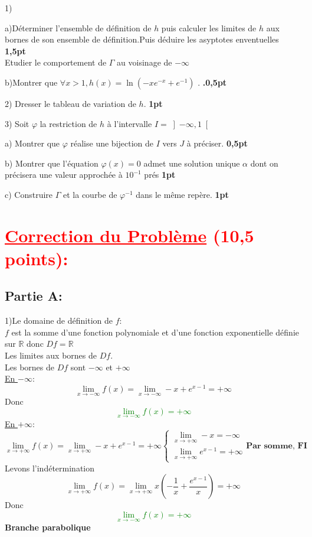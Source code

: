 \documentclass[12pt]{article}
\begin{document}
1)

	a)Déterminer l’ensemble de définition de $h$ puis calculer les limites de $h$ aux bornes de son ensemble de définition.Puis déduire les asyptotes enventuelles \textbf{1,5pt}\\
Etudier le comportement de  $\Gamma$ au voisinage de $-\infty$

	b)Montrer que $\forall x>1, h(x)=\ln(-xe^{-x}+e^{-1}) $ . \textbf{.0,5pt}
	
2) Dresser le tableau de variation de  $h$.   \textbf{1pt}
    
3) Soit $\varphi$ la restriction de $h$ à l’intervalle $I=\left]-\infty, 1\right[ $
    
    a) Montrer que $\varphi$  réalise une bijection de $I$ vers $J$  à préciser.
    \textbf{0,5pt}
        
    b) Montrer que l’équation $\varphi(x)=0$ admet une solution unique $\alpha$ dont on précisera une valeur approchée à $10^{-1}$ prés   \textbf{1pt}
    
    c) Construire $\Gamma$ et la courbe de $\varphi^{-1}$  dans le même repère.  \textbf{1pt}
\section*{\textcolor{red}{\underline{Correction du Problème} (10,5 points):}}
\subsection*{Partie A:}
1)Le domaine de définition de $f$:\\
$f$ est la somme d'une fonction polynomiale et d'une fonction exponentielle définie sur $\mathbb{R}$ donc $Df=\mathbb{R}$\\
Les limites aux bornes de $Df$.\\
Les bornes de $Df$ sont $-\infty$ et $+\infty$\\
\underline{En $-\infty$}:
\[\lim_{x \to -\infty}f(x)=\lim_{x \to -\infty}-x+e^{x-1}=+\infty\]
Donc \textcolor{green}{\[\lim_{x \to -\infty}f(x)=+\infty\]}
\underline{En $+\infty$}:
\begin{equation*}
\lim_{x \to +\infty}f(x)=\lim_{x \to +\infty}-x+e^{x-1}=+\infty
\begin{cases}
\lim_{x \to +\infty} -x=-\infty\\
\lim_{x \to +\infty}e^{x-1}=+\infty
\end{cases}
\textbf{Par somme, FI}
\end{equation*}
Levons l'indétermination\\
\begin{equation*}
\lim_{x \to +\infty}f(x)=\lim_{x \to +\infty}x\left(-\frac{1}{x}+\frac{e^{x-1}}{x}\right)=+\infty
\end{equation*}
Donc \textcolor{green}{\[\lim_{x \to -\infty}f(x)=+\infty\]}
\textbf{Branche parabolique}
 
\end{document}
